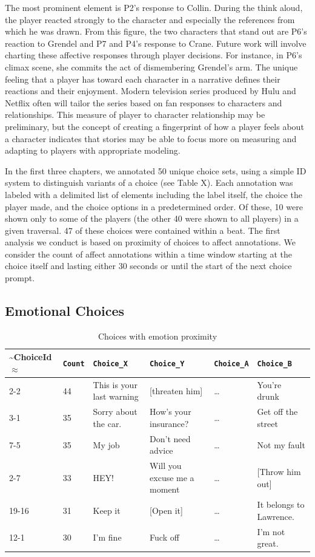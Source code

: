 The most prominent element is P2's response to Collin. During the
think aloud, the player reacted strongly to the character and
especially the references from which he was drawn. From this figure,
the two characters that stand out are P6's reaction to Grendel and P7
and P4's response to Crane. Future work will involve charting these
affective responses through player decisions. For instance, in P6's
climax scene, she commits the act of dismembering Grendel's arm. The
unique feeling that a player has toward each character in a narrative
defines their reactions and their enjoyment. Modern television series
produced by Hulu and Netflix often will tailor the series based on fan
responses to characters and relationships. This measure of player to
character relationship may be preliminary, but the concept of creating
a fingerprint of how a player feels about a character indicates that
stories may be able to focus more on measuring and adapting to players
with appropriate modeling.

In the first three chapters, we annotated 50 unique choice sets, using
a simple ID system to distinguish variants of a choice (see Table
X). Each annotation was labeled with a delimited list of elements
including the label itself, the choice the player made, and the choice
options in a predetermined order. Of these, 10 were shown only to some
of the players (the other 40 were shown to all players) in a given
traversal. 47 of these choices were contained within a beat. The first
analysis we conduct is based on proximity of choices to affect
annotations. We consider the count of affect annotations within a time
window starting at the choice itself and lasting either 30 seconds or
until the start of the next choice prompt.

\subsection{Emotional Choices}
\label{sec:orgd19dfdd}
\begin{table}[htbp]
\caption{\label{tab:org5b03fb1}
Choices with emotion proximity}
\centering
\begin{tabular}{llllll}
\textasciitilde{}ChoiceId\(\approx\) & \texttt{Count} & \texttt{Choice\_X} & \texttt{Choice\_Y} & \texttt{Choice\_A} & \texttt{Choice\_B}\\
\hline
2-2 & 44 & This is your last warning & [threaten him] & \ldots{} & You're drunk\\
3-1 & 35 & Sorry about the car. & How's your insurance? & \ldots{} & Get off the street\\
7-5 & 35 & My job & Don't need advice & \ldots{} & Not my fault\\
2-7 & 33 & HEY! & Will you excuse me a moment & \ldots{} & [Throw him out]\\
19-16 & 31 & Keep it & [Open it] & \ldots{} & It belongs to Lawrence.\\
12-1 & 30 & I'm fine & Fuck off & \ldots{} & I'm not great.\\
\end{tabular}
\end{table}


